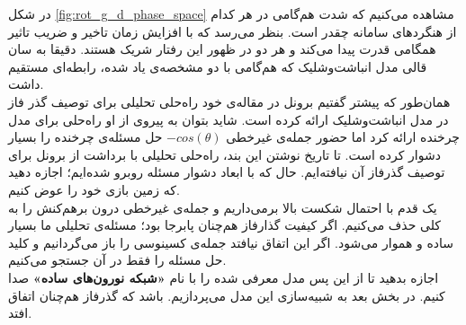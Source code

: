 در شکل \ref{fig:rot_g_d_phase_space} مشاهده می‌کنیم که شدت هم‌گامی در هر کدام از هنگردهای سامانه چقدر است. بنظر می‌رسد که با افزایش زمان تاخیر و ضریب تاثیر همگامی قدرت پیدا می‌کند و هر دو در ظهور این رفتار شریک هستند. دقیقا به سان قالی مدل انباشت‌وشلیک که هم‌گامی با دو مشخصه‌ی یاد شده، رابطه‌ای مستقیم داشت.\\

همان‌طور که پیشتر گفتیم برونل در مقاله‌ی خود 
\cite{brunel2000dynamics}
راه‌حلی تحلیلی برای توصیف گذر فاز در مدل انباشت‌وشلیک ارائه کرده است. شاید بتوان به پیروی از او راه‌حلی برای مدل چرخنده ارائه کرد اما حضور جمله‌ی غیرخطی
$- cos(\theta)$
حل مسئله‌ی چرخنده‌ را بسیار دشوار کرده است. تا تاریخ نوشتن این بند، راه‌حلی تحلیلی با برداشت از برونل برای توصیف گذرفاز آن نیافته‌ایم. حال که با ابعاد دشوار مسئله روبرو شده‌ایم؛ اجازه دهید که زمین بازی خود را عوض کنیم.\\

یک قدم با احتمال شکست بالا برمی‌داریم و جمله‌ی غیرخطی درون برهم‌کنش را به کلی حذف می‌کنیم. اگر کیفیت گذارفاز هم‌چنان پابرجا بود؛ مسئله‌ی تحلیلی ما بسیار ساده و هموار می‌شود. اگر این اتفاق نیافتد جمله‌ی کسینوسی را باز می‌گردانیم و کلید حل مسئله را فقط در آن جستجو می‌کنیم.\\

اجازه بدهید تا از این پس مدل معرفی شده را با نام 
\textbf{
«شبکه‌ نورون‌های ساده»
}
صدا کنیم. در بخش بعد به شبیه‌سازی این مدل می‌پردازیم. باشد که گذرفاز هم‌چنان اتفاق افتد.
